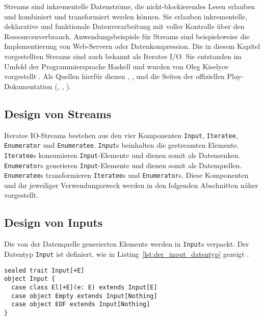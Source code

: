 Streams sind inkrementelle Datenströme, die nicht-blockierendes Lesen erlauben und kombiniert und transformiert werden können.
Sie erlauben inkrementelle, deklarative und funktionale Datenverarbeitung mit voller Kontrolle über den Ressourcenverbrauch.
Anwendungsbeispiele für Streams sind beispielsweise die Implementierung von Web-Servern oder Datenkompression.
Die in diesem Kapitel vorgestellten Streams sind auch bekannt als Iteratee I/O.
Sie entstanden im Umfeld der Programmiersprache Haskell und wurden von Oleg Kiselyov vorgestellt \cite[vgl.][S.~19]{monad_reader}.
Als Quellen hierfür dienen \citealt{kiselyov2012}, \citealt{iteratee_io}, \citealt{monad_reader} und die Seiten der offiziellen Play-Dokumentation (\citealt{iteratees}, \cite{enumerators}, \cite{play_api_documentation}).


\subsection{Design von Streams} %
\label{sub:design}

Iteratee IO-Streams bestehen aus den vier Komponenten \lstinline|Input|, \lstinline|Iteratee|, \lstinline|Enumerator| und \lstinline|Enumeratee|.
\lstinline|Input|s beinhalten die gestreamten Elemente.
\lstinline|Iteratee|s konsumieren \lstinline|Input|-Elemente und dienen somit als Datensenken.
\lstinline|Enumerator|s generieren \lstinline|Input|-Elemente und dienen somit als Datenquellen.
\lstinline|Enumeratee|s transformieren \lstinline|Iteratee|s und \lstinline|Enumerator|s.
Diese Komponenten und ihr jeweiliger Verwendungszweck werden in den folgenden Abschnitten näher vorgestellt.



\subsection{Design von Inputs} %
\label{sub:design_inputs}

Die von der Datenquelle generierten Elemente werden in \lstinline|Input|s verpackt.
Der Datentyp \lstinline|Input| ist definiert, wie in Listing~\ref{lst:der_input_datentyp} gezeigt \cite[vgl.][Z.~224]{play_iteratee_source_code}.

\begin{lstlisting}[caption=Der Input-Datentyp, label=lst:der_input_datentyp]
sealed trait Input[+E]
object Input {
  case class El[+E](e: E) extends Input[E]
  case object Empty extends Input[Nothing]
  case object EOF extends Input[Nothing]
}
\end{lstlisting}

